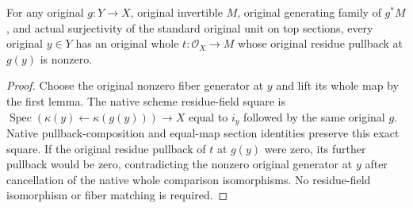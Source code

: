 \begin{lemma}
\label{lem:original-standard-unit-generator-lift-nonzero-fiber}
\leanok
For any original $g:Y\to X$, original invertible $M$, original generating
family of $g^*M$, and actual surjectivity of the standard original unit
on top sections, every original $y\in Y$ has an original whole
$t:\mathcal O_X\to M$ whose original residue pullback at $g(y)$ is
nonzero.
\end{lemma}
\begin{proof}
Choose the original nonzero fiber generator at $y$ and lift its whole
map by the first lemma. The native scheme residue-field square is
$\operatorname{Spec}(\kappa(y)\leftarrow\kappa(g(y)))\to X$ equal to
$i_y$ followed by the same original $g$. Native pullback-composition
and equal-map section identities preserve this exact square. If the
original residue pullback of $t$ at $g(y)$ were zero, its further
pullback would be zero, contradicting the nonzero original generator
at $y$ after cancellation of the native whole comparison isomorphisms.
No residue-field isomorphism or fiber matching is required.
\end{proof}

